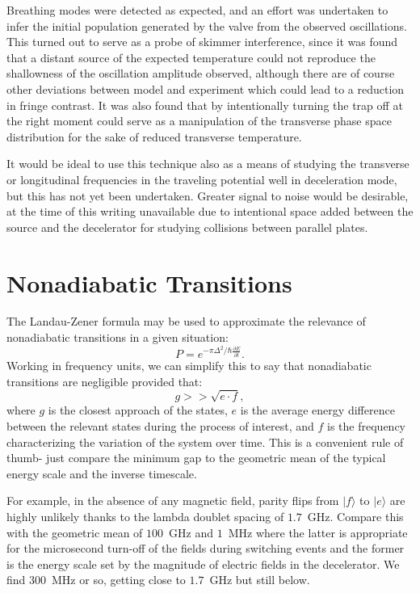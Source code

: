 Breathing modes were detected as expected, and an effort was undertaken to infer the initial population generated by the valve from the observed oscillations.
This turned out to serve as a probe of skimmer interference, since it was found that a distant source of the expected temperature could not reproduce the shallowness of the oscillation amplitude observed, although there are of course other deviations between model and experiment which could lead to a reduction in fringe contrast.
It was also found that by intentionally turning the trap off at the right moment could serve as a manipulation of the transverse phase space distribution for the sake of reduced transverse temperature.

It would be ideal to use this technique also as a means of studying the transverse or longitudinal frequencies in the traveling potential well in deceleration mode, but this has not yet been undertaken. 
Greater signal to noise would be desirable, at the time of this writing unavailable due to intentional space added between the source and the decelerator for studying collisions between parallel plates.

\section{Nonadiabatic Transitions}\label{sec:spinflipdecel}

The Landau-Zener formula may be used to approximate the relevance of nonadiabatic transitions in a given situation:
\begin{equation}
P=e^{-\pi\Delta^2/\hbar\frac{\partial E}{\partial t}}.
\end{equation}
Working in frequency units, we can simplify this to say that nonadiabatic transitions are negligible provided that:
\begin{equation}
g >> \sqrt{e\cdot f},
\end{equation}
where $g$ is the closest approach of the states, $e$ is the average energy difference between the relevant states during the process of interest, and $f$ is the frequency characterizing the variation of the system over time.
This is a convenient rule of thumb- just compare the minimum gap to the geometric mean of the typical energy scale and the inverse timescale.

For example, in the absence of any magnetic field, parity flips from $|f\rangle$ to $|e\rangle$ are highly unlikely thanks to the lambda doublet spacing of $1.7$~GHz.
Compare this with the geometric mean of $100$~GHz and $1$~MHz where the latter is appropriate for the microsecond turn-off of the fields during switching events and the former is the energy scale set by the magnitude of electric fields in the decelerator.
We find $300$~MHz or so, getting close to $1.7$~GHz but still below.

